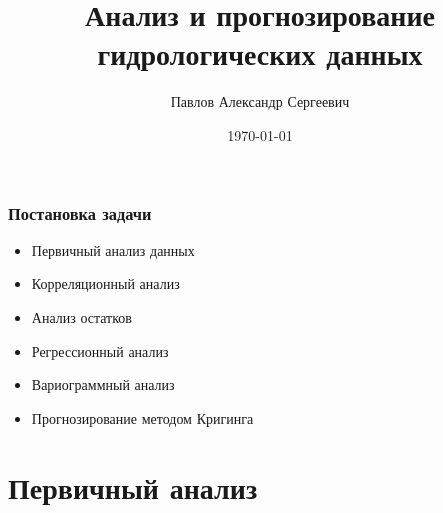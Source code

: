 \documentclass[10pt,pdf,aspectratio=169]{beamer}
\title[Анализ и прогнозирование гидрологических данных]{Анализ и прогнозирование гидрологических данных}    %
\author[Павлов Александр]{Павлов Александр Сергеевич}                 %
\institute{Кафедра Теории Вероятностей и Математической Статистики}      %
\date{\today}                    %
\begin{document}
\begin{frame}
  \titlepage
\end{frame}




\section{}

\begin{frame}
  \frametitle{Постановка задачи}   %

  \begin{itemize}
    \item Первичный анализ данных
    \item Корреляционный анализ
    \item Анализ остатков
    \item Регрессионный анализ
    \item Вариограммный анализ
    \item Прогнозирование методом Кригинга
  \end{itemize}
\end{frame}

\section{Первичный анализ}
\end{document}
